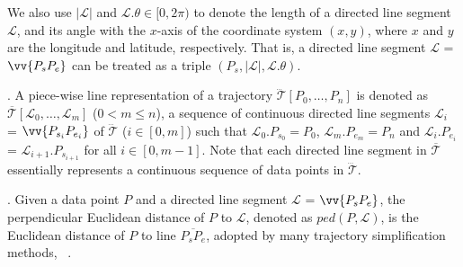 We also use $|\mathcal{L}|$ and $\mathcal{L}.\theta\in [0, 2\pi)$ to denote the length of a directed line segment $\mathcal{L}$, and its angle with the $x$-axis of the coordinate system $(x, y)$, where $x$ and $y$ are the longitude and latitude, respectively.
That is, a directed line segment $\mathcal{L}$ = $\vv{P_{s}P_{e}}$ can be treated as a triple $(P_s, |\mathcal{L}|, \mathcal{L}.\theta)$.

. A piece-wise line representation of a trajectory $\dddot{\mathcal{T}}[P_0, \ldots, P_n]$ is denoted as $\overline{\mathcal{T}}[\mathcal{L}_0, \ldots , \mathcal{L}_m]$ ($0< m \le n$), a sequence of continuous directed line segments $\mathcal{L}_{i}$ = $\vv{P_{s_i}P_{e_i}}$ of $\dddot{\mathcal{T}}$ ($i\in[0,m]$)  such that $\mathcal{L}_{0}.P_{s_0} = P_0$, $\mathcal{L}_{m}.P_{e_m} = P_n$ and  $\mathcal{L}_{i}.P_{e_i}$ = $\mathcal{L}_{i+1}.P_{s_{i+1}}$ for all $i\in[0, m-1]$. Note that each directed line segment in $\overline{\mathcal{T}}$ essentially represents a continuous sequence of data points in $\dddot{\mathcal{T}}$.



. Given a data point $P$ and a directed line segment $\mathcal{L}$ = $\vv{P_{s}P_{e}}$, the perpendicular Euclidean distance of $P$ to $\mathcal{L}$, denoted as $ped(P, \mathcal{L})$, is the Euclidean distance of $P$ to line $\overline{P_{s}P_{e}}$, adopted by many trajectory simplification methods, \eg~\cite{Douglas:Peucker, Hershberger:Speeding, Liu:BQS, Williams:Longest, Sklansky:Cone, Dunham:Cone, Zhao:Sleeve, Lin:Operb}.


